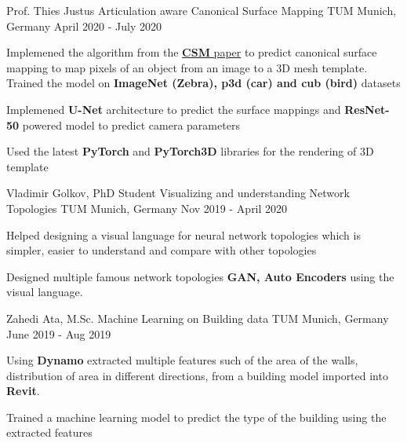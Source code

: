 \begin{cventries}
	\cventry
	{Prof. Thies Justus} %
	{Articulation aware Canonical Surface Mapping} %
	{TUM Munich, Germany} %
	{April 2020 - July 2020} %
	{
		\begin{cvitems} %
			\item {Implemened the algorithm from the
			\href{https://arxiv.org/abs/2004.00614}{\textbf{CSM} paper} to predict canonical
			surface mapping to map pixels of an object from an image to a 3D
			mesh template. Trained the model on \textbf{ImageNet (Zebra), p3d (car) and
			cub (bird)} datasets}
			\item {Implemened \textbf{U-Net} architecture to predict the surface
			mappings and \textbf{ResNet-50} powered model to predict camera parameters}
			\item {Used the latest \textbf{PyTorch} and \textbf{PyTorch3D} libraries for the rendering of 3D template}
		\end{cvitems}
	}

	\cventry
	{Vladimir Golkov, PhD Student} %
	{Visualizing and understanding Network Topologies} %
	{TUM Munich, Germany} %
	{Nov 2019 - April 2020} %
	{
		\begin{cvitems} %
			\item {Helped designing a visual language for neural network topologies which is simpler, easier to understand and compare with other topologies}
			\item {Designed multiple famous network topologies \textbf{GAN,
			Auto Encoders} using the visual language.}
		\end{cvitems}
	}
	
	\cventry
	{Zahedi Ata, M.Sc.} %
	{Machine Learning on Building data} %
	{TUM Munich, Germany} %
	{June 2019 - Aug 2019} %
	{
		\begin{cvitems} %
			\item {Using \textbf{Dynamo} extracted multiple features such of the area of the walls, distribution of area in different directions, from a building model imported into \textbf{Revit}.} 
			\item {Trained a machine learning model to predict the type of the building using the extracted features}
		\end{cvitems}
	}


\end{cventries}

